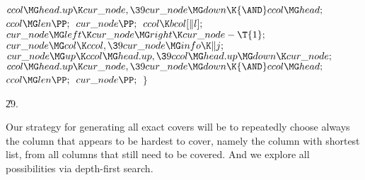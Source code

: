 ${}\\{ccol}\MG\\{head}.\\{up}\K\\{cur\_node},\39\\{cur\_node}\MG\\{down}\K{%
\AND}\\{ccol}\MG\\{head};{}$\6
${}\\{ccol}\MG\\{len}\PP;{}$\6
${}\\{cur\_node}\PP;{}$\6
${}\\{ccol}\K\\{bcol}[\|l];{}$\6
${}\\{cur\_node}\MG\\{left}\K\\{cur\_node}\MG\\{right}\K\\{cur\_node}-\T{1};{}$%
\6
${}\\{cur\_node}\MG\\{col}\K\\{ccol},\39\\{cur\_node}\MG\\{info}\K\|j;{}$\6
${}\\{cur\_node}\MG\\{up}\K\\{ccol}\MG\\{head}.\\{up},\39\\{ccol}\MG\\{head}.%
\\{up}\MG\\{down}\K\\{cur\_node};{}$\6
${}\\{ccol}\MG\\{head}.\\{up}\K\\{cur\_node},\39\\{cur\_node}\MG\\{down}\K{%
\AND}\\{ccol}\MG\\{head};{}$\6
${}\\{ccol}\MG\\{len}\PP;{}$\6
${}\\{cur\_node}\PP;{}$\6
\4${}\}{}$\2\par
\U29.\fi

Our strategy for generating all exact covers will be to repeatedly
choose always the column that appears to be hardest to cover, namely the
column with shortest list, from all columns that still need to be covered.
And we explore all possibilities via depth-first search.

